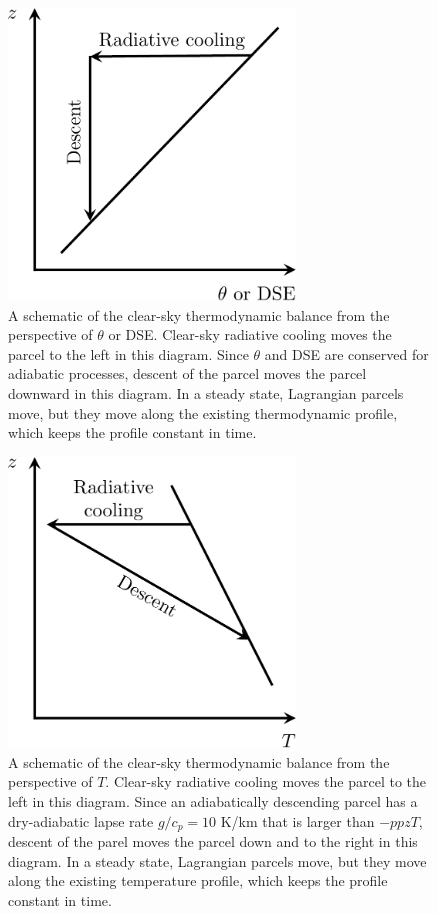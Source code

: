 \documentclass[12pt]{article}
\begin{document}
\begin{figure}
\begin{center}
\includegraphics[width=3in]{../figures/17leshouches_descent_dse.pdf}
\caption{A schematic of the clear-sky thermodynamic balance from the perspective of $\theta$ or DSE.  Clear-sky radiative cooling moves the parcel to the left in this diagram.  Since $\theta$ and DSE are conserved for adiabatic processes, descent of the parcel moves the parcel downward in this diagram.  In a steady state, Lagrangian parcels move, but they move along the existing thermodynamic profile, which keeps the profile constant in time.}
\label{17leshouches_descent_dse}
\end{center}
\end{figure}


\begin{figure}
\begin{center}
\includegraphics[width=3in]{../figures/17leshouches_descent_tabs.pdf}
\caption{A schematic of the clear-sky thermodynamic balance from the perspective of $T$.  Clear-sky radiative cooling moves the parcel to the left in this diagram.  Since an adiabatically descending parcel has a dry-adiabatic lapse rate $g/c_p = 10$ K/km that is larger than $-ppz T$, descent of the parel moves the parcel down and to the right in this diagram.  In a steady state, Lagrangian parcels move, but they move along the existing temperature profile, which keeps the profile constant in time.}
\label{17leshouches_descent_tabs}
\end{center}
\end{figure}
\end{document}
